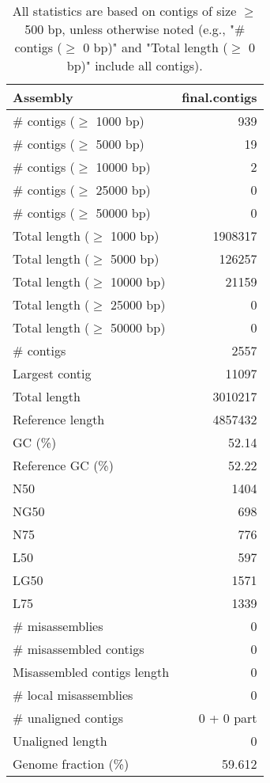 \documentclass[12pt,a4paper]{article}
\begin{document}
\begin{table}[ht]
\begin{center}
\caption{All statistics are based on contigs of size $\geq$ 500 bp, unless otherwise noted (e.g., "\# contigs ($\geq$ 0 bp)" and "Total length ($\geq$ 0 bp)" include all contigs).}
\begin{tabular}{|l*{1}{|r}|}
\hline
Assembly & final.contigs \\ \hline
\# contigs ($\geq$ 1000 bp) & 939 \\ \hline
\# contigs ($\geq$ 5000 bp) & 19 \\ \hline
\# contigs ($\geq$ 10000 bp) & 2 \\ \hline
\# contigs ($\geq$ 25000 bp) & 0 \\ \hline
\# contigs ($\geq$ 50000 bp) & 0 \\ \hline
Total length ($\geq$ 1000 bp) & 1908317 \\ \hline
Total length ($\geq$ 5000 bp) & 126257 \\ \hline
Total length ($\geq$ 10000 bp) & 21159 \\ \hline
Total length ($\geq$ 25000 bp) & 0 \\ \hline
Total length ($\geq$ 50000 bp) & 0 \\ \hline
\# contigs & 2557 \\ \hline
Largest contig & 11097 \\ \hline
Total length & 3010217 \\ \hline
Reference length & 4857432 \\ \hline
GC (\%) & 52.14 \\ \hline
Reference GC (\%) & 52.22 \\ \hline
N50 & 1404 \\ \hline
NG50 & 698 \\ \hline
N75 & 776 \\ \hline
L50 & 597 \\ \hline
LG50 & 1571 \\ \hline
L75 & 1339 \\ \hline
\# misassemblies & 0 \\ \hline
\# misassembled contigs & 0 \\ \hline
Misassembled contigs length & 0 \\ \hline
\# local misassemblies & 0 \\ \hline
\# unaligned contigs & 0 + 0 part \\ \hline
Unaligned length & 0 \\ \hline
Genome fraction (\%) & 59.612 \\ \hline

\end{tabular}
\end{center}
\end{table}
\end{document}

